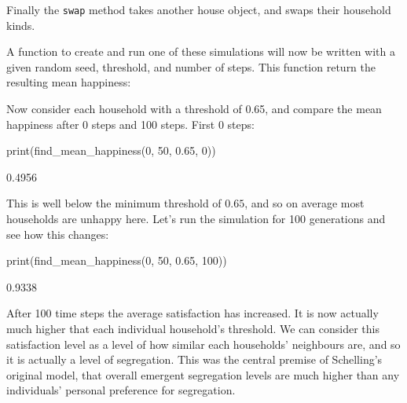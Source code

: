 Finally the \texttt{swap} method takes another house object, and
swaps their household kinds.

A function to create and run one of these simulations will now be written
with a given random seed, threshold, and number of steps. This function return
the resulting mean happiness:



Now consider each household with a threshold of
0.65, and compare the mean happiness after 0 steps and 100 steps.
First 0 steps:

\begin{Rin}
print(find_mean_happiness(0, 50, 0.65, 0))
\end{Rin}

\begin{Rout}
[1] 0.4956
\end{Rout}

This is well below the minimum threshold of \(0.65\), and so on average most
households are unhappy here.
Let's run the simulation for 100 generations and see how this changes:

\begin{Rin}
print(find_mean_happiness(0, 50, 0.65, 100))
\end{Rin}

\begin{Rout}
[1] 0.9338
\end{Rout}

After 100 time steps the average satisfaction has increased.
It is now actually much higher that each individual household's threshold.
We can consider this satisfaction level as a level of how similar each
households' neighbours are, and so it is actually a level of segregation.
This was the central premise of Schelling's original
model\autocite{schelling2006micromotives}, that overall
emergent segregation levels are much higher than any individuals' personal
preference for segregation.

